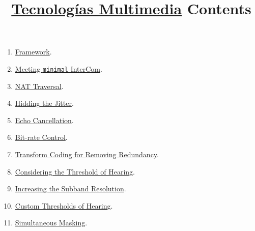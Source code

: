
\title{\href{https://tecnologias-multimedia.github.io/}{Tecnologías Multimedia} \newline Contents}

\maketitle

\begin{enumerate}
\item \href{https://tecnologias-multimedia.github.io/contents/framework/}{Framework}.
\item \href{https://tecnologias-multimedia.github.io/contents/minimal/}{Meeting \texttt{minimal} InterCom}.
\item \href{https://tecnologias-multimedia.github.io/contents/NAT_traversal/}{NAT Traversal}.
\item \href{https://tecnologias-multimedia.github.io/contents/jitter/}{Hidding the Jitter}.
\item \href{https://tecnologias-multimedia.github.io/contents/echo_cancellation/}{Echo Cancellation}.
\item \href{https://tecnologias-multimedia.github.io/contents/BR_control/}{Bit-rate Control}.
\item \href{https://tecnologias-multimedia.github.io/contents/transform_coding/}{Transform Coding for Removing Redundancy}.
\item \href{https://tecnologias-multimedia.github.io/contents/threshold_of_hearing/}{Considering the Threshold of Hearing}.
\item \href{https://tecnologias-multimedia.github.io/contents/high_resolution_ToH/}{Increasing the Subband Resolution}.
\item \href{https://tecnologias-multimedia.github.io/contents/custom_ToH/}{Custom Thresholds of Hearing}.
\item \href{https://tecnologias-multimedia.github.io/contents/simultaneous_masking/}{Simultaneous Masking}.
\end{enumerate}



